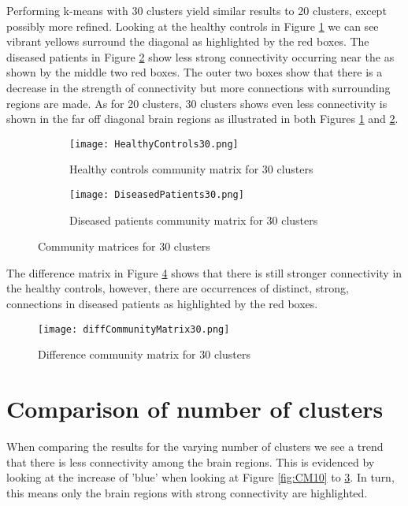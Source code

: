 Performing k-means with 30 clusters yield similar results to 20 clusters, except possibly more refined. Looking at the healthy controls in Figure \ref{fig:CM30healthy} we can see vibrant yellows surround the diagonal as highlighted by the red boxes. The diseased patients in Figure \ref{fig:CM30diseased} show less strong connectivity occurring near the as shown by the middle two red boxes. The outer two boxes show that there is a decrease in the strength of connectivity but more connections with surrounding regions are made. As for 20 clusters, 30 clusters shows even less connectivity is shown in the far off diagonal brain regions as illustrated in both Figures \ref{fig:CM30healthy} and \ref{fig:CM30diseased}.

\begin{figure}[h!] 
	\centering
	\begin{subfigure}[b]{.49\textwidth}
		\texttt{[image: HealthyControls30.png]}
		\caption{Healthy controls community matrix for 30 clusters}
		\label{fig:CM30healthy}
	\end{subfigure}
	\begin{subfigure}[b]{.49\textwidth}
		\texttt{[image: DiseasedPatients30.png]}
		\caption{Diseased patients community matrix for 30 clusters}
		\label{fig:CM30diseased}
	\end{subfigure}
	\caption{Community matrices for 30 clusters}
	\label{fig:CM30}
\end{figure}

The difference matrix in Figure \ref{fig:CM30diff} shows that there is still stronger connectivity in the healthy controls, however, there are occurrences of distinct, strong, connections in diseased patients as highlighted by the red boxes.

\begin{figure}[h!] 
	\centering
	\texttt{[image: diffCommunityMatrix30.png]}
	\caption{Difference community matrix for 30 clusters}
	\label{fig:CM30diff}
\end{figure}

\section{Comparison of number of clusters}
When comparing the results for the varying number of clusters we see a trend that there is less connectivity among the brain regions. This is evidenced by looking at the increase of 'blue' when looking at Figure \ref{fig:CM10} to \ref{fig:CM30}. In turn, this means only the brain regions with strong connectivity are highlighted. 


